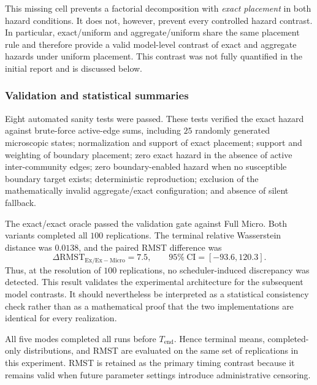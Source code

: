 This missing cell prevents a factorial decomposition with \emph{exact placement} in both hazard conditions.  It does not, however, prevent every controlled hazard contrast.  In particular, exact/uniform and aggregate/uniform share the same placement rule and therefore provide a valid model-level contrast of exact and aggregate hazards under uniform placement.  This contrast was not fully quantified in the initial report and is discussed below.

\subsubsection{Validation and statistical summaries}
\label{sec:hazard_placement_validation}

Eight automated sanity tests were passed.  These tests verified the exact hazard against brute-force active-edge sums, including $25$ randomly generated microscopic states; normalization and support of exact placement; support and weighting of boundary placement; zero exact hazard in the absence of active inter-community edges; zero boundary-enabled hazard when no susceptible boundary target exists; deterministic reproduction; exclusion of the mathematically invalid aggregate/exact configuration; and absence of silent fallback.

The exact/exact oracle passed the validation gate against Full Micro.  Both variants completed all $100$ replications.  The terminal relative Wasserstein distance was $0.0138$, and the paired RMST difference was
\[
\Delta\mathrm{RMST}_{\mathrm{Ex/Ex}-\mathrm{Micro}}
=7.5,
\qquad
95\%\ \mathrm{CI}=[-93.6,120.3].
\]
Thus, at the resolution of $100$ replications, no scheduler-induced discrepancy was detected.  This result validates the experimental architecture for the subsequent model contrasts.  It should nevertheless be interpreted as a statistical consistency check rather than as a mathematical proof that the two implementations are identical for every realization.

All five modes completed all runs before $T_{\mathrm{end}}$.  Hence terminal means, completed-only distributions, and RMST are evaluated on the same set of replications in this experiment.  RMST is retained as the primary timing contrast because it remains valid when future parameter settings introduce administrative censoring.

